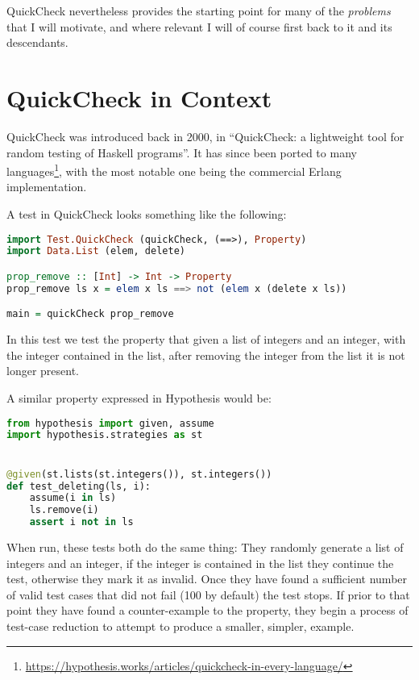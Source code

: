 QuickCheck nevertheless provides the starting point for many of the \emph{problems} that I will motivate,
and where relevant I will of course first back to it and its descendants.

\chapter{QuickCheck in Context}

QuickCheck was introduced back in 2000,
in ``QuickCheck: a lightweight tool for random testing of Haskell programs''\cite{DBLP:conf/icfp/ClaessenH00}.
It has since been ported to many languages\footnote{\url{https://hypothesis.works/articles/quickcheck-in-every-language/}},
with the most notable one being the commercial Erlang implementation\cite{DBLP:conf/erlang/ArtsHJW06}.

A test in QuickCheck looks something like the following:

\begin{lstlisting}[language=Haskell]
import Test.QuickCheck (quickCheck, (==>), Property)
import Data.List (elem, delete)

prop_remove :: [Int] -> Int -> Property
prop_remove ls x = elem x ls ==> not (elem x (delete x ls))

main = quickCheck prop_remove
\end{lstlisting}

In this test we test the property that given a list of integers and an integer,
with the integer contained in the list,
after removing the integer from the list it is not longer present.

A similar property expressed in Hypothesis would be:

\begin{lstlisting}[language=Python]
from hypothesis import given, assume
import hypothesis.strategies as st


@given(st.lists(st.integers()), st.integers())
def test_deleting(ls, i):
    assume(i in ls)
    ls.remove(i)
    assert i not in ls
\end{lstlisting}

When run, these tests both do the same thing:
They randomly generate a list of integers and an integer,
if the integer is contained in the list they continue the test,
otherwise they mark it as invalid.
Once they have found a sufficient number of valid test cases that did not fail (100 by default) the test stops.
If prior to that point they have found a counter-example to the property,
they begin a process of test-case reduction to attempt to produce a smaller, simpler, example.

